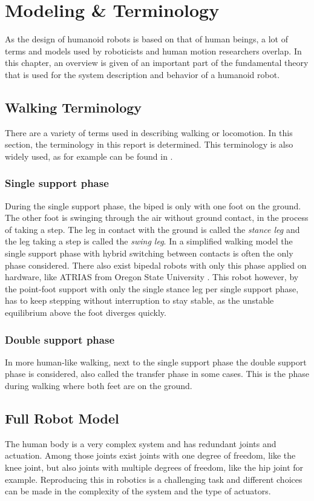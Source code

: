 %
\chapter{Modeling \& Terminology}%
\label{chap:modeling}
As the design of humanoid robots is based on that of human beings, a lot of terms and models used by roboticists and human motion researchers overlap.  In this chapter, an overview is given of an important part of the fundamental theory that is used for the system description and behavior of a humanoid robot. 
\section{Walking Terminology}
There are a variety of terms used in describing walking or locomotion. In this section, the terminology in this report is determined. This terminology is also widely used, as for example can be found in \cite{charalambous2014walking}.
\subsection{Single support phase}
During the single support phase, the biped is only with one foot on the ground. The other foot is swinging through the air without ground contact, in the process of taking a step. The leg in contact with the ground is called the \textit{stance leg} and the leg taking a step is called the \textit{swing leg}. In a simplified walking model the single support phase with hybrid switching between contacts is often the only phase considered. There also exist bipedal robots with only this phase applied on hardware, like ATRIAS from Oregon State University \cite{ramezani2014performance}. This robot however, by the point-foot support with only the single stance leg per single support phase, has to keep stepping without interruption to stay stable, as the unstable equilibrium above the foot diverges quickly. 
\subsection{Double support phase}
In more human-like walking, next to the single support phase the double support phase is considered, also called the transfer phase in some cases. This is the phase during walking where both feet are on the ground.

\section{Full Robot Model}
The human body is a very complex system and has redundant joints and actuation. Among those joints exist joints with one degree of freedom, like the knee joint, but also joints with multiple degrees of freedom, like the hip joint for example. Reproducing this in robotics is a challenging task and different choices can be made in the complexity of the system and the type of actuators. 
